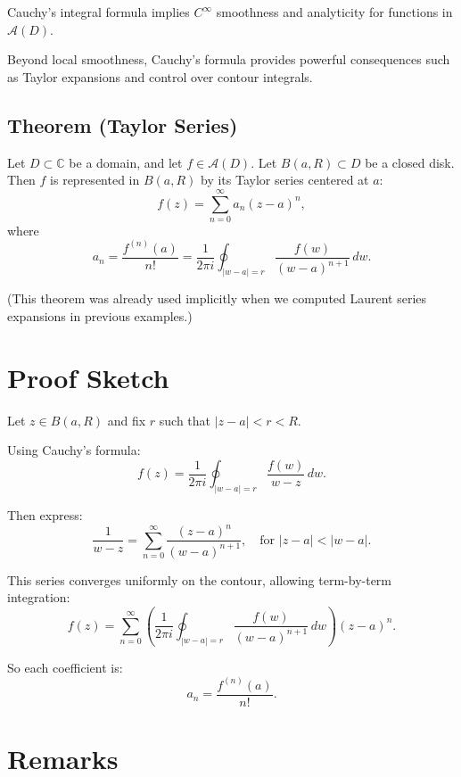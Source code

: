\documentclass[12pt]{article}
\theoremstyle{definition} %
\theoremstyle{plain} %
\begin{document}
Cauchy's integral formula implies $C^\infty$ smoothness and analyticity for functions in $\mathcal{A}(D)$.

Beyond local smoothness, Cauchy's formula provides powerful consequences such as Taylor expansions and control over contour integrals.

\subsection*{Theorem (Taylor Series)}

Let $D \subset \mathbb{C}$ be a domain, and let $f \in \mathcal{A}(D)$. Let $B(a, R) \subset D$ be a closed disk. Then $f$ is represented in $B(a, R)$ by its Taylor series centered at $a$:
\[
f(z) = \sum_{n=0}^\infty a_n (z - a)^n,
\]
where
\[
a_n = \frac{f^{(n)}(a)}{n!} = \frac{1}{2\pi i} \oint_{|w - a| = r} \frac{f(w)}{(w - a)^{n+1}}\,dw.
\]

(This theorem was already used implicitly when we computed Laurent series expansions in previous examples.)

\section*{Proof Sketch}

Let $z \in B(a, R)$ and fix $r$ such that $|z - a| < r < R$.

Using Cauchy’s formula:
\[
f(z) = \frac{1}{2\pi i} \oint_{|w - a| = r} \frac{f(w)}{w - z}\,dw.
\]

Then express:
\[
\frac{1}{w - z} = \sum_{n=0}^\infty \frac{(z - a)^n}{(w - a)^{n+1}}, \quad \text{for } |z - a| < |w - a|.
\]

This series converges uniformly on the contour, allowing term-by-term integration:
\[
f(z) = \sum_{n=0}^\infty \left( \frac{1}{2\pi i} \oint_{|w - a| = r} \frac{f(w)}{(w - a)^{n+1}}\,dw \right)(z - a)^n.
\]

So each coefficient is:
\[
a_n = \frac{f^{(n)}(a)}{n!}.
\]

\section*{Remarks}
\end{document}

